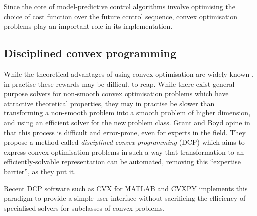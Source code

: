 Since the core of model-predictive control algorithms involve optimising the choice of cost function over the future control sequence, convex optimisation problems play an important role in its implementation.

\subsection{Disciplined convex programming}

While the theoretical advantages of using convex optimisation are widely known \cite{Luo06}, in practise these rewards may be difficult to reap.
While there exist general-purpose solvers for non-smooth convex optimisation problems which have attractive theoretical properties, they may in practise be slower than transforming a non-smooth problem into a smooth problem of higher dimension, and using an efficient solver for the new problem class.
Grant and Boyd opine in \cite{Grant08} that this process is difficult and error-prone, even for experts in the field.
They propose a method called {\it disciplined convex programming} (DCP) \cite{Grant06} which aims to express convex optimisation problems in such a way that transformation to an efficiently-solvable representation can be automated, removing this ``expertise barrier'', as they put it.

Recent DCP software such as CVX for MATLAB \cite{CVX} and CVXPY \cite{CVXPY} implements this paradigm to provide a simple user interface without sacrificing the efficiency of specialised solvers for subclasses of convex problems.

